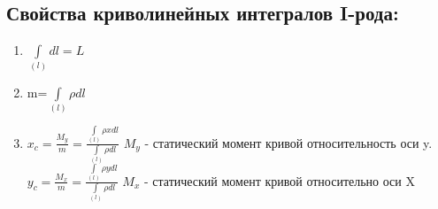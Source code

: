 \documentclass[12pt]{article}
\let\oldint\int
\renewcommand{\int}{\oldint\limits}
\begin{document}
  \subsection*{Свойства криволинейных интегралов I-рода:}
  \begin{enumerate}
    \item $\int_{(l)}dl=L$
    \item m=$\int_{(l)}\rho dl$
    \item $x_c=\frac{M_y}{m}=\frac{\int_{(l)}\rho xdl}{\int_{(l)}\rho dl}$ \hspace{20pt}
    $M_y$ - статический момент кривой относительность оси y.\\
    $y_c = \frac{M_x}{m}=\frac{\int_{(l)}\rho ydl}{\int_{(l)}\rho dl}$ \hspace{20pt}
    $M_x$ - статический момент кривой относительно оси X
  \end{enumerate}
\end{document}

